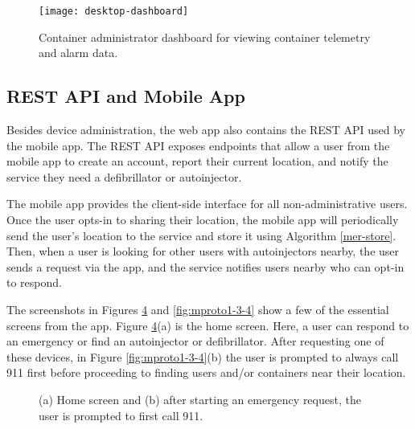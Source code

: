 \begin{figure}[h]
\texttt{[image: desktop-dashboard]}
\caption{Container administrator dashboard for viewing container telemetry and alarm data.}
\label{fig:desktop-dashboard}
\end{figure}

\subsection{REST API and Mobile App} \label{sec:soft-design-mobile-app}

Besides device administration, the web app also contains the REST API used by the mobile app. The REST API exposes endpoints that allow a user from the mobile app to create an account, report their current location, and notify the service they need a defibrillator or autoinjector.

The mobile app provides the client-side interface for all non-administrative users. Once the user opts-in to sharing their location, the mobile app will periodically send the user's location to the service and store it using Algorithm \ref{mer-store}. Then, when a user is looking for other users with autoinjectors nearby, the user sends a request via the app, and the service notifies users nearby who can opt-in to respond.

The screenshots in Figures \ref{fig:mproto1-1-2} and \ref{fig:mproto1-3-4} show a few of the essential screens from the app. Figure \ref{fig:mproto1-1-2}(a) is the home screen. Here, a user can respond to an emergency or find an autoinjector or defibrillator.  After requesting one of these devices, in Figure \ref{fig:mproto1-3-4}(b) the user is prompted to always call 911 first before proceeding to finding users and/or containers near their location.

\begin{figure}[h]
\centering
\begin{subfigure}{.5\textwidth}
  \centering
{}
\label{fig:mproto-1}
\end{subfigure}%
\begin{subfigure}{.5\textwidth}
  \centering
{}
\label{fig:mproto1-2}
\end{subfigure}
\caption{(a) Home screen and (b) after starting an emergency request, the user is prompted to first call 911.}
\label{fig:mproto1-1-2}
\end{figure}

